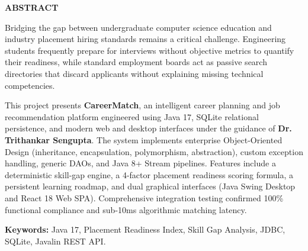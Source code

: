 \documentclass[11pt,a4paper]{report}
\begin{document}
\vspace{0.4cm}
\begin{center}
    {\large \textbf{ABSTRACT}}\\[0.2cm]
\end{center}
{\small
Bridging the gap between undergraduate computer science education and industry placement hiring standards remains a critical challenge. Engineering students frequently prepare for interviews without objective metrics to quantify their readiness, while standard employment boards act as passive search directories that discard applicants without explaining missing technical competencies. 

This project presents \textbf{CareerMatch}, an intelligent career planning and job recommendation platform engineered using Java 17, SQLite relational persistence, and modern web and desktop interfaces under the guidance of \textbf{Dr. Trithankar Sengupta}. The system implements enterprise Object-Oriented Design (inheritance, encapsulation, polymorphism, abstraction), custom exception handling, generic DAOs, and Java 8+ Stream pipelines. Features include a deterministic skill-gap engine, a 4-factor placement readiness scoring formula, a persistent learning roadmap, and dual graphical interfaces (Java Swing Desktop and React 18 Web SPA). Comprehensive integration testing confirmed 100\% functional compliance and sub-10ms algorithmic matching latency.

\vspace{0.2cm}
\noindent \textbf{Keywords:} Java 17, Placement Readiness Index, Skill Gap Analysis, JDBC, SQLite, Javalin REST API.
}
\end{document}
